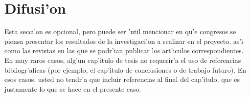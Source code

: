 \section{Difusi'on}
\noindent
Esta secci'on es opcional, pero puede ser 'util mencionar en qu'e congresos se piensa presentar los resultados de la investigaci'on a realizar en el proyecto, as'i como las revistas en las que se podr'ian publicar los art'iculos correspondientes.
\newpage
En muy raros casos, alg'un cap'itulo de tesis no requerir'a el uso de referencias bibliogr'aficas (por ejemplo, el cap'itulo de conclusiones o de trabajo futuro). En esos casos, usted no tendr'a que incluir referencias al final del cap'itulo, que es justamente lo que se hace en el presente caso.

\clearpage
